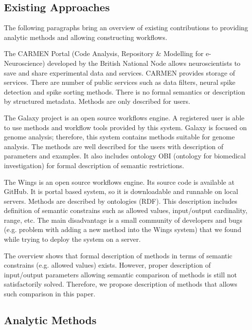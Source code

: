 \documentclass[a4paper,twoside]{article}
\begin{document}
\subsection{Existing Approaches}

The following paragraphs bring an overview of existing contributions to providing  analytic methods and allowing constructing workflows.

The CARMEN Portal \cite{Watson07} (Code Analysis, Repository \& Modelling for e-Neuroscience) developed by the British National Node allows neuroscientists to save and share experimental data and services. CARMEN provides storage of services. There are number of public services such as data filters, neural spike detection and spike sorting methods. There is no formal semantics or description by structured metadata. Methods are only described for users.

The Galaxy project \cite{goecks2010galaxy, blankenberg2010galaxy, giardine2005galaxy} is an open source workflows engine. A registered user is able to use methods and workflow tools provided by this system. Galaxy is focused on genome analysis; therefore, this system contains methods suitable for genome analysis. The methods are well described for the users with description of parameters and examples. It also includes ontology OBI (ontology for biomedical investigation) for formal description of semantic restrictions.

The Wings is an open source workflows engine. Its source code is available at GitHub. It is portal based system, so it is downloadable and runnable on local servers. Methods are described by ontologies (RDF). This description includes definition of semantic constrains such as allowed values, input/output cardinality, range, etc. The main disadvantage is a small community of developers and bugs (e.g. problem with adding a new method into the Wings system) that we found while trying to deploy the system on a server. 

The overview shows that formal description of methods in terms of semantic constrains (e.g. allowed values) exists. However, proper description of input/output parameters allowing semantic comparison of methods is still not satisfactorily solved. Therefore, we propose description of methods that allows such comparison in this paper.


\subsection{Analytic Methods}
\end{document}
